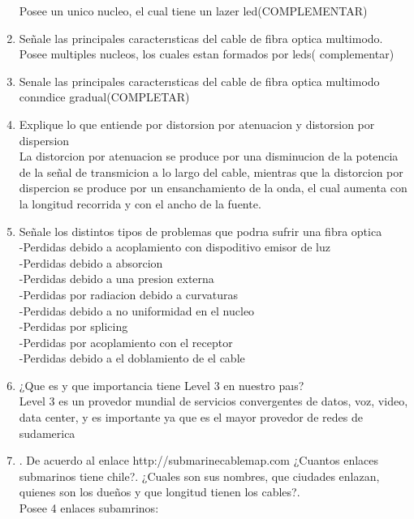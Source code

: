 \documentclass{udparticle}
\begin{document}
\begin{enumerate}
  Posee un unico nucleo, el cual tiene un lazer led(COMPLEMENTAR)\\
  \item Señale las principales caracterısticas del cable de ﬁbra optica multimodo. \\
  Posee multiples nucleos, los cuales estan formados por leds(  complementar)\\
  \item Senale las principales caracterısticas del cable de ﬁbra optica multimodo conındice gradual(COMPLETAR)\\
  \item Explique lo que entiende por distorsion por atenuacion y distorsion por dispersion\\
  La distorcion por atenuacion se produce por una disminucion de la potencia de la señal de transmicion a lo largo del cable, mientras que la distorcion por dispercion se produce por un ensanchamiento de la onda, el cual aumenta con la longitud recorrida y con el ancho de la fuente.\\
  \item Señale los distintos tipos de problemas que podrıa sufrir una ﬁbra optica\\
  -Perdidas debido a acoplamiento con dispoditivo emisor de luz\\
  -Perdidas debido a absorcion\\
  -Perdidas debido a una presion externa\\
  -Perdidas por radiacion debido a curvaturas \\
  -Perdidas debido a no uniformidad en el nucleo\\
  -Perdidas por splicing\\
  -Perdidas por acoplamiento con el receptor\\
  -Perdidas debido a el doblamiento de el cable\\
  \item ¿Que es y que importancia tiene Level 3 en nuestro paıs?\\
  Level 3 es un provedor mundial de servicios convergentes de datos, voz, video, data center, y es importante ya que es el mayor provedor de redes de sudamerica\\
  \item . De acuerdo al enlace http://submarinecablemap.com ¿Cuantos enlaces submarinos tiene chile?.
¿Cuales son sus nombres, que ciudades enlazan, quienes son los dueños y que longitud tienen
los cables?.\\
Posee 4 enlaces subamrinos:\\

\end{enumerate}
\end{document}
